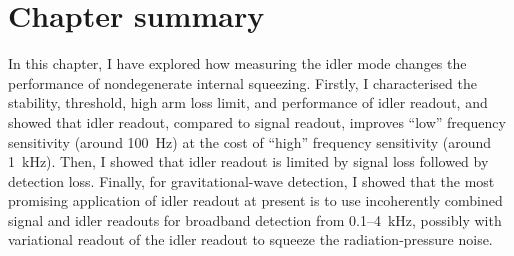 \section{Chapter summary}

In this chapter, I have explored how measuring the idler mode changes the performance of nondegenerate internal squeezing. %
Firstly, I characterised the stability, threshold, high arm loss limit, and performance of idler readout, %
and showed that idler readout, compared to signal readout, improves ``low'' frequency sensitivity (around 100~Hz) at the cost of ``high'' frequency sensitivity (around 1~kHz).
Then, I showed that idler readout is limited by signal loss followed by detection loss.  %
Finally, for gravitational-wave detection, I showed that the most promising application of idler readout at present is to use incoherently combined signal and idler readouts for broadband detection from 0.1--4~kHz, possibly with variational readout of the idler readout to squeeze the radiation-pressure noise. %



